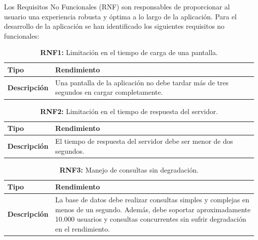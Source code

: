 \documentclass[a4paper, 12pt]{article}
\begin{document}
Los Requisitos No Funcionales (RNF) son responsables de proporcionar al usuario una experiencia robusta y óptima a lo largo de la aplicación. Para el desarrollo de la aplicación se han identificado los siguientes requisitos no funcionales:


\begin{table}[H]
\captionsetup{list=no}%
\captionsetup{justification=raggedright,singlelinecheck=false}
\captionsetup{labelformat=empty}
\caption*{\textbf{RNF1:} Limitación en el tiempo de carga de una pantalla.}
\label{tab:RNF1}
    \begin{tabular}{|m{5cm}|m{10cm}|}
	    \hline
	    \textbf{Tipo} & Rendimiento \\ 
	    \hline
	    \textbf{Descripción} & Una pantalla de la aplicación no debe tardar más de tres segundos en cargar completamente. \\ 
	    \hline
    \end{tabular}
\end{table}


\begin{table}[H]
\captionsetup{list=no}%
\captionsetup{justification=raggedright,singlelinecheck=false}
\captionsetup{labelformat=empty}
\caption*{\textbf{RNF2:} Limitación en el tiempo de respuesta del servidor.}
\label{tab:RNF2}
    \begin{tabular}{|m{5cm}|m{10cm}|}
	    \hline
	    \textbf{Tipo} & Rendimiento \\ 
	    \hline
	    \textbf{Descripción} & El tiempo de respuesta del servidor debe ser menor de dos segundos. \\ 
	    \hline
    \end{tabular}
\end{table}

\begin{table}[H]
\captionsetup{list=no}%
\captionsetup{justification=raggedright,singlelinecheck=false}
\captionsetup{labelformat=empty}
\caption*{\textbf{RNF3:} Manejo de consultas sin degradación.}
\label{tab:RNF3}
    \begin{tabular}{|m{5cm}|m{10cm}|}
	    \hline
	    \textbf{Tipo} & Rendimiento \\ 
	    \hline
	    \textbf{Descripción} & La base de datos debe realizar consultas simples y complejas en menos de un segundo. Además, debe soportar aproximadamente 10.000 usuarios y consultas concurrentes sin sufrir degradación en el rendimiento. \\ 
	    \hline
    \end{tabular}
\end{table}
\end{document}
